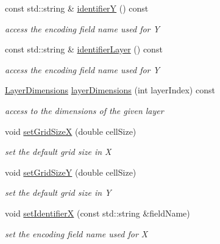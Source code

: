 \begin{DoxyCompactItemize}
const std::string \& \hyperlink{class_d_d4hep_1_1_d_d_segmentation_1_1_tiled_layer_segmentation_a75781ecca4bd534b4fa4d8bcd50089db}{identifierY} () const 
\begin{DoxyCompactList}\small\item\em access the encoding field name used for Y \item\end{DoxyCompactList}\item 
const std::string \& \hyperlink{class_d_d4hep_1_1_d_d_segmentation_1_1_tiled_layer_segmentation_acc2b11119a4e51ea4667e36fb4db6ef3}{identifierLayer} () const 
\begin{DoxyCompactList}\small\item\em access the encoding field name used for Y \item\end{DoxyCompactList}\item 
\hyperlink{struct_d_d4hep_1_1_d_d_segmentation_1_1_tiled_layer_segmentation_1_1_layer_dimensions}{LayerDimensions} \hyperlink{class_d_d4hep_1_1_d_d_segmentation_1_1_tiled_layer_segmentation_a9eed70ede18e3595af6330f70cdcb60f}{layerDimensions} (int layerIndex) const 
\begin{DoxyCompactList}\small\item\em access to the dimensions of the given layer \item\end{DoxyCompactList}\item 
void \hyperlink{class_d_d4hep_1_1_d_d_segmentation_1_1_tiled_layer_segmentation_aeb24630c5ce6f0510d516affa3fd798f}{setGridSizeX} (double cellSize)
\begin{DoxyCompactList}\small\item\em set the default grid size in X \item\end{DoxyCompactList}\item 
void \hyperlink{class_d_d4hep_1_1_d_d_segmentation_1_1_tiled_layer_segmentation_a1d3f9e083551c3a67500d7da77d33684}{setGridSizeY} (double cellSize)
\begin{DoxyCompactList}\small\item\em set the default grid size in Y \item\end{DoxyCompactList}\item 
void \hyperlink{class_d_d4hep_1_1_d_d_segmentation_1_1_tiled_layer_segmentation_adab12f13ca0d94e18e8d2ef82c8115cb}{setIdentifierX} (const std::string \&fieldName)
\begin{DoxyCompactList}\small\item\em set the encoding field name used for X \item\end{DoxyCompactList}\item 

\end{DoxyCompactItemize}

